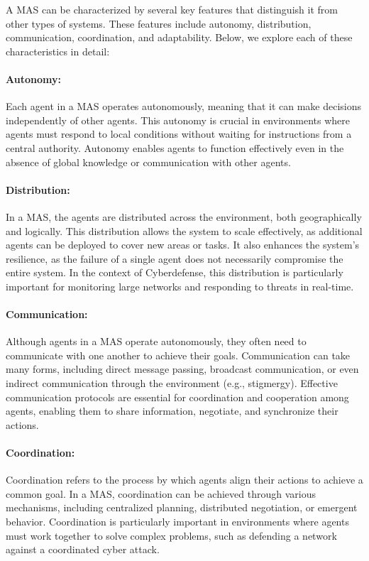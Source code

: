 A MAS can be characterized by several key features that distinguish it from other types of systems. These features include autonomy, distribution, communication, coordination, and adaptability. Below, we explore each of these characteristics in detail:

\paragraph{Autonomy:}
Each agent in a MAS operates autonomously, meaning that it can make decisions independently of other agents. This autonomy is crucial in environments where agents must respond to local conditions without waiting for instructions from a central authority. Autonomy enables agents to function effectively even in the absence of global knowledge or communication with other agents.

\paragraph{Distribution:}
In a MAS, the agents are distributed across the environment, both geographically and logically. This distribution allows the system to scale effectively, as additional agents can be deployed to cover new areas or tasks. It also enhances the system's resilience, as the failure of a single agent does not necessarily compromise the entire system. In the context of Cyberdefense, this distribution is particularly important for monitoring large networks and responding to threats in real-time.

\paragraph{Communication:}
Although agents in a MAS operate autonomously, they often need to communicate with one another to achieve their goals. Communication can take many forms, including direct message passing, broadcast communication, or even indirect communication through the environment (e.g., stigmergy). Effective communication protocols are essential for coordination and cooperation among agents, enabling them to share information, negotiate, and synchronize their actions.

\paragraph{Coordination:}
Coordination refers to the process by which agents align their actions to achieve a common goal. In a MAS, coordination can be achieved through various mechanisms, including centralized planning, distributed negotiation, or emergent behavior. Coordination is particularly important in environments where agents must work together to solve complex problems, such as defending a network against a coordinated cyber attack.

